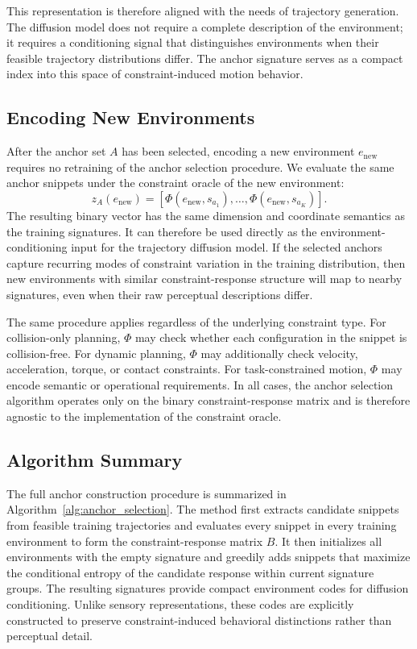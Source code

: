 This representation is therefore aligned with the needs of trajectory generation. The diffusion model does not require a complete description of the environment; it requires a conditioning signal that distinguishes environments when their feasible trajectory distributions differ. The anchor signature serves as a compact index into this space of constraint-induced motion behavior.

\subsection{Encoding New Environments}

After the anchor set $A$ has been selected, encoding a new environment $e_{\mathrm{new}}$ requires no retraining of the anchor selection procedure. We evaluate the same anchor snippets under the constraint oracle of the new environment:
%
\begin{equation}
    z_A(e_{\mathrm{new}})
    =
    \left[
        \Phi(e_{\mathrm{new}},s_{a_1}),
        \ldots,
        \Phi(e_{\mathrm{new}},s_{a_K})
    \right].
\end{equation}
%
The resulting binary vector has the same dimension and coordinate semantics as the training signatures. It can therefore be used directly as the environment-conditioning input for the trajectory diffusion model. If the selected anchors capture recurring modes of constraint variation in the training distribution, then new environments with similar constraint-response structure will map to nearby signatures, even when their raw perceptual descriptions differ.

The same procedure applies regardless of the underlying constraint type. For collision-only planning, $\Phi$ may check whether each configuration in the snippet is collision-free. For dynamic planning, $\Phi$ may additionally check velocity, acceleration, torque, or contact constraints. For task-constrained motion, $\Phi$ may encode semantic or operational requirements. In all cases, the anchor selection algorithm operates only on the binary constraint-response matrix and is therefore agnostic to the implementation of the constraint oracle.

\subsection{Algorithm Summary}

The full anchor construction procedure is summarized in Algorithm~\ref{alg:anchor_selection}. The method first extracts candidate snippets from feasible training trajectories and evaluates every snippet in every training environment to form the constraint-response matrix $B$. It then initializes all environments with the empty signature and greedily adds snippets that maximize the conditional entropy of the candidate response within current signature groups. The resulting signatures provide compact environment codes for diffusion conditioning. Unlike sensory representations, these codes are explicitly constructed to preserve constraint-induced behavioral distinctions rather than perceptual detail.


